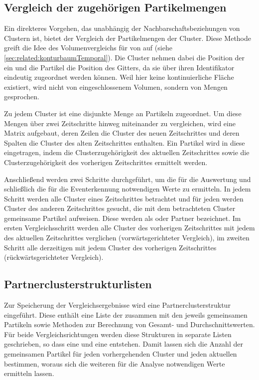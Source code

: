 \subsection*{Vergleich der zugehörigen Partikelmengen}\label{sec:secc:partner}
Ein direkteres Vorgehen, das unabhängig der Nachbarschaftsbeziehungen von Clustern ist, bietet der Vergleich der Partikelmengen der Cluster. Diese Methode greift die Idee des Volumenvergleichs für  von  auf (siehe \autoref{sec:related:konturbaumTemporal}). Die Cluster nehmen dabei die Position der  ein und die Partikel die Position des Gitters, da sie über ihren Identifikator eindeutig zugeordnet werden können. Weil hier keine kontinuierliche Fläche existiert, wird nicht von eingeschlossenem Volumen, sondern von Mengen gesprochen.

Zu jedem Cluster ist eine disjunkte Menge an Partikeln zugeordnet. Um diese Mengen über zwei Zeitschritte hinweg miteinander zu vergleichen, wird eine Matrix aufgebaut, deren Zeilen die Cluster des neuen Zeitschrittes und deren Spalten die Cluster des alten Zeitschrittes enthalten. Ein Partikel wird in diese  eingetragen, indem die Clusterzugehörigkeit des aktuellen Zeitschrittes sowie die Clusterzugehörigkeit des vorherigen Zeitschrittes ermittelt werden.

Anschließend werden zwei Schritte durchgeführt, um die für die Auswertung und schließlich die für die Eventerkennung notwendigen Werte zu ermitteln. In jedem Schritt werden alle Cluster eines Zeitschrittes betrachtet und für jeden werden Cluster des anderen Zeitschrittes gesucht, die mit dem betrachteten Cluster gemeinsame Partikel aufweisen. Diese werden als  oder Partner bezeichnet. Im ersten Vergleichsschritt werden alle Cluster des vorherigen Zeitschrittes mit jedem des aktuellen Zeitschrittes verglichen (vorwärtsgerichteter Vergleich), im zweiten Schritt alle derzeitigen mit jedem Cluster des vorherigen Zeitschrittes (rückwärtsgerichteter Vergleich). 

\subsection*{Partnerclusterstrukturlisten}\label{sec:partnerclusterstrukturlisten}
Zur Speicherung der Vergleichsergebnisse wird eine Partnerclusterstruktur eingeführt. Diese enthält eine Liste der  zusammen mit den jeweils gemeinsamen Partikeln sowie Methoden zur Berechnung von Gesamt- und Durchschnittswerten. Für beide Vergleichsrichtungen werden diese Strukturen in separate Listen geschrieben, so dass eine  und eine  entstehen. Damit lassen sich die Anzahl der gemeinsamen Partikel für jeden vorhergehenden Cluster und jeden aktuellen bestimmen, woraus sich die weiteren für die Analyse notwendigen Werte ermitteln lassen.

